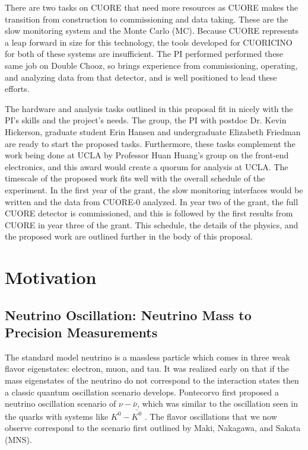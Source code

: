 There are two tasks on CUORE that need more resources as CUORE makes the transition from construction to commissioning and data taking. These are the slow monitoring system and the Monte Carlo (MC). Because CUORE represents a leap forward in size for this technology, the tools developed for CUORICINO for both of these systems are insufficient. The PI performed performed these same job on Double Chooz, so brings experience from commissioning, operating, and analyzing data from that detector, and is well positioned to lead these efforts.    

The hardware and analysis tasks outlined in this proposal fit in nicely with the PI's skills and the project's needs. The group, the PI with  postdoc Dr. Kevin Hickerson, graduate student Erin Hansen and undergraduate Elizabeth Friedman are ready to start the proposed tasks. Furthermore, these tasks complement the work being done at UCLA  by Professor Huan Huang's group on the front-end electronics, and this award would create a quorum for analysis at UCLA. The timescale of the proposed work fits well with the overall schedule of the experiment. In the first year of the grant, the slow monitoring interfaces would be written and the data from CUORE-0 analyzed. In year two of the grant, the full CUORE detector is commissioned, and this is followed by the first results from CUORE in year three of the grant. This schedule, the details of the physics, and the proposed work are outlined further in the body of this proposal.


\section{Motivation}
\subsection{Neutrino Oscillation: Neutrino Mass to Precision Measurements}
The standard model neutrino is a massless particle which comes in three weak flavor eigenstates: electron, muon, and tau. It was realized early on that if the mass eigenstates of the neutrino do not correspond to the interaction states then a classic quantum oscillation scenario develops. Pontecorvo first proposed a neutrino oscillation scenario of  $\nu-\bar{\nu}$, which was similar to the oscillation seen in the quarks with systems like $K^{0}-\bar{K^{0}}$ \cite{Pontecorvo:1957qd}. The flavor oscillations that we now observe correspond to the scenario first outlined by Maki, Nakagawa, and Sakata (MNS)\cite{Maki:1962mu}. 

